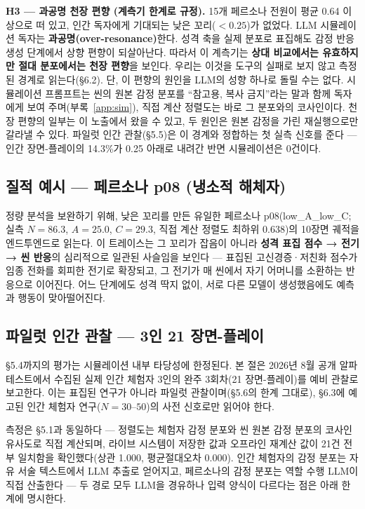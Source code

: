 \documentclass[11pt, a4paper]{article}
\begin{document}
\textbf{H3 --- 과공명 천장 편향 (계측기 한계로 규정).} 15개 페르소나 전원이 평균 0.64 이상으로 떠 있고, 인간 독자에게 기대되는 낮은 꼬리($< 0.25$)가 없었다. LLM 시뮬레이션 독자는 \textbf{과공명(over-resonance)}한다. 성격 축을 실제 분포로 표집해도 감정 반응 생성 단계에서 상향 편향이 되살아난다. 따라서 이 계측기는 \textbf{상대 비교에서는 유효하지만 절대 분포에서는 천장 편향}을 보인다. 우리는 이것을 도구의 실패로 보지 않고 측정된 경계로 읽는다(\S6.2). 단, 이 편향의 원인을 LLM의 성향 하나로 돌릴 수는 없다. 시뮬레이션 프롬프트는 씬의 원본 감정 분포를 ``참고용, 복사 금지''라는 말과 함께 독자에게 보여 주며(부록~\ref{app:sim}), 직접 계산 정렬도는 바로 그 분포와의 코사인이다. 천장 편향의 일부는 이 노출에서 왔을 수 있고, 두 원인은 원본 감정을 가린 재실행으로만 갈라낼 수 있다. 파일럿 인간 관찰(\S5.5)은 이 경계와 정합하는 첫 실측 신호를 준다 --- 인간 장면-플레이의 14.3\%가 0.25 아래로 내려간 반면 시뮬레이션은 0건이다.

\subsection{질적 예시 --- 페르소나 p08 (냉소적 해체자)}
정량 분석을 보완하기 위해, 낮은 꼬리를 만든 유일한 페르소나 p08(low\_A\_low\_C; 실측 $N=86.3$, $A=25.0$, $C=29.3$, 직접 계산 정렬도 최하위 0.638)의 10장면 궤적을 엔드투엔드로 읽는다. 이 트레이스는 그 꼬리가 잡음이 아니라 \textbf{성격 표집 점수 → 전기 → 씬 반응}의 심리적으로 일관된 사슬임을 보인다 --- 표집된 고신경증·저친화 점수가 임종 전화를 회피한 전기로 확장되고, 그 전기가 매 씬에서 자기 어머니를 소환하는 반응으로 이어진다. 어느 단계에도 성격 딱지 없이, 서로 다른 모델이 생성했음에도 예측과 행동이 맞아떨어진다.

\subsection{파일럿 인간 관찰 --- 3인 21 장면-플레이}

\S5.4까지의 평가는 시뮬레이션 내부 타당성에 한정된다. 본 절은 2026년 8월 공개 알파 테스트에서 수집된 실제 인간 체험자 3인의 완주 3회차(21 장면-플레이)를 예비 관찰로 보고한다. 이는 표집된 연구가 아니라 파일럿 관찰이며(\S5.6의 한계 그대로), \S6.3에 예고된 인간 체험자 연구($N=30$--$50$)의 사전 신호로만 읽어야 한다.

측정은 \S5.1과 동일하다 --- 정렬도는 체험자 감정 분포와 씬 원본 감정 분포의 코사인 유사도로 직접 계산되며, 라이브 시스템이 저장한 값과 오프라인 재계산 값이 21건 전부 일치함을 확인했다(상관 1.000, 평균절대오차 0.000). 인간 체험자의 감정 분포는 자유 서술 텍스트에서 LLM 추출로 얻어지고, 페르소나의 감정 분포는 역할 수행 LLM이 직접 산출한다 --- 두 경로 모두 LLM을 경유하나 입력 양식이 다르다는 점은 아래 한계에 명시한다.
\end{document}
